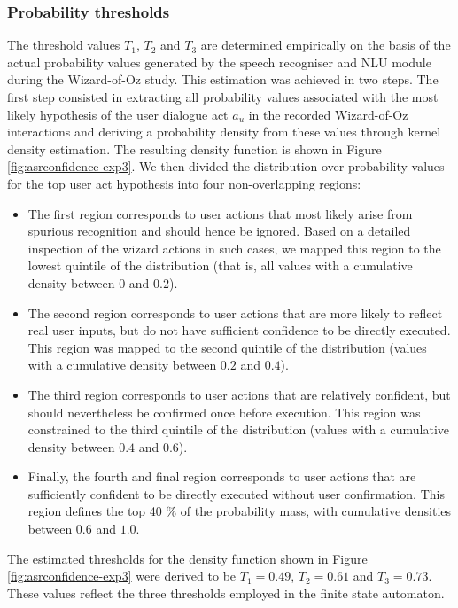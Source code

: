 \subsubsection*{Probability thresholds}

The threshold values $T_1$, $T_2$ and $T_3$ are determined empirically on the basis of the actual probability values generated by the speech recogniser and NLU module during the Wizard-of-Oz study.  This estimation was achieved in two steps.  The first step consisted in  extracting all probability values associated with the most likely hypothesis of the user dialogue act $a_u$ in the recorded Wizard-of-Oz interactions and deriving a probability density from these values through kernel density estimation. The resulting density function is shown in Figure \ref{fig:asrconfidence-exp3}. We then divided the distribution over probability values for the top user act hypothesis into four non-overlapping regions:
\begin{itemize}
\item The first region corresponds to user actions that most likely arise from spurious recognition and should hence be ignored. Based on a detailed inspection of the wizard actions in such cases, we mapped this region to the lowest quintile of the distribution (that is, all values with a cumulative density between $0$ and $0.2$). 
\item The second region corresponds to user actions that are more likely to reflect real user inputs, but do not have sufficient confidence to be directly executed.  This region was mapped to the second quintile of the distribution (values with a cumulative density between $0.2$ and $0.4$).
\item The third region corresponds to user actions that are relatively confident, but should nevertheless be confirmed once before execution.  This region was constrained to the third quintile of the distribution (values with a cumulative density between $0.4$ and $0.6$).
\item Finally, the fourth and final region corresponds to user actions that are sufficiently confident to be directly executed without user confirmation. This region defines the top 40 \% of the probability mass, with cumulative densities between $0.6$ and $1.0$.
\end{itemize}

The estimated thresholds for the density function shown in Figure \ref{fig:asrconfidence-exp3} were derived to be $T_1 = 0.49$, $T_2 = 0.61$ and $T_3 = 0.73$. These values reflect the three thresholds employed in the finite state automaton. 


